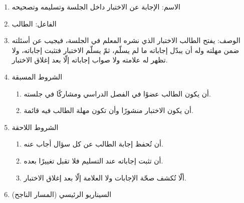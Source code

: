 \begin{enumerate}
  \item الاسم: الإجابة عن الاختبار داخل الجلسة وتسليمه وتصحيحه
  \item الفاعل: الطالب
  \item الوصف: يفتح الطالب الاختبار الذي نشره المعلم في الجلسة، فيجيب عن أسئلته ضمن مهلته وله أن يبدّل إجاباته ما لم يسلّم، ثمّ يسلّم الاختبار فتثبت إجاباته، ولا تظهر له علامته ولا صواب إجاباته إلّا بعد إغلاق الاختبار.
  \item الشروط المسبقة
  \begin{enumerate}
    \item أن يكون الطالب عضوًا في الفصل الدراسي ومشاركًا في جلسته.
    \item أن يكون الاختبار منشورًا وأن تكون مهلة الطالب فيه قائمة.
  \end{enumerate}
  \item الشروط اللاحقة
  \begin{enumerate}
    \item أن تُحفظ إجابة الطالب عن كل سؤال أجاب عنه.
    \item أن تثبت إجاباته عند التسليم فلا تقبل تغييرًا بعده.
    \item ألّا تُكشف صحّة الإجابات ولا العلامة إلّا بعد إغلاق الاختبار.
  \end{enumerate}
  \item السيناريو الرئيسي (المسار الناجح)
\end{enumerate}

